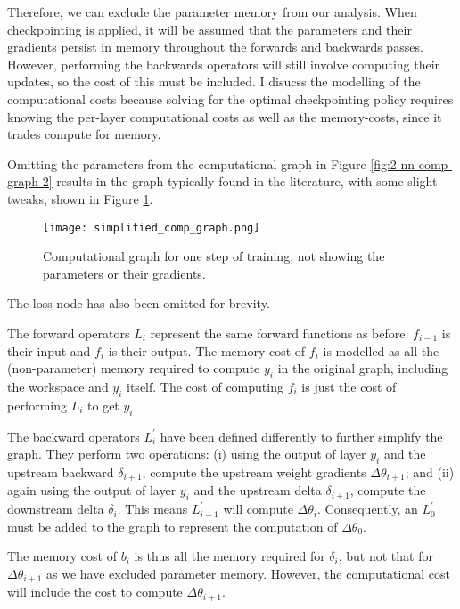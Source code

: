 Therefore, we can exclude the parameter memory from our analysis.
When checkpointing is applied, it will be assumed that the parameters and their gradients persist in memory throughout the forwards and backwards passes.
However, performing the backwards operators will still involve computing their updates, so the cost of this must be included.
I disucss the modelling of the computational costs because solving for the optimal checkpointing policy requires knowing the per-layer computational costs as well as the memory-costs, since it trades compute for memory.

Omitting the parameters from the computational graph in Figure \ref{fig:2-nn-comp-graph-2} results in the graph typically found in the literature, with some slight tweaks, shown in Figure \ref{fig:2-simplified-comp-graph}.

\begin{figure}[h]
    \centering
    \texttt{[image: simplified\_comp\_graph.png]}
    \caption{Computational graph for one step of training, not showing the parameters or their gradients.}
    \label{fig:2-simplified-comp-graph}
\end{figure}

The loss node has also been omitted for brevity.

The forward operators \(L_i\) represent the same forward functions as before.
\(f_{i-1}\) is their input and \(f_{i}\) is their output.
The memory cost of \(f_i\) is modelled as all the (non-parameter) memory required to compute \(y_i\) in the original graph, including the workspace and \(y_i\) itself.
The cost of computing \(f_i\) is just the cost of performing \(L_i\) to get \(y_i\)

The backward operators \(L^\prime_i\) have been defined differently to further simplify the graph. They perform two operations:
(i) using the output of layer \(y_i\) and the upstream backward \(\delta_{i+1}\), compute the upstream weight gradients \(\Delta\theta_{i+1}\); and
(ii) again using the output of layer \(y_i\) and the upstream delta \(\delta_{i+1}\), compute the downstream delta \(\delta_i\).
This means \(L^\prime_{i-1}\) will compute \(\Delta\theta_{i}\).
Consequently, an \(L^\prime_0\) must be added to the graph to represent the computation of \(\Delta\theta_0\).

The memory cost of \(b_i\) is thus all the memory required for \(\delta_i\), but not that for \(\Delta\theta_{i+1}\) as we have excluded parameter memory. However, the computational cost will include the cost to compute \(\Delta\theta_{i+1}\).

